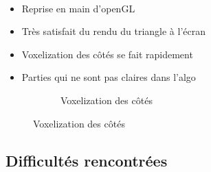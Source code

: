 \begin{frame}[fragile=singleslide]{\insertsectionhead}
  \framesubtitle{\insertsubsectionhead}
  \begin{itemize}
    \item Reprise en main d'openGL
  \end{itemize}
  \vspace{0.3cm}
  \begin{itemize}
    \item Très satisfait du rendu du triangle à l'écran
  \end{itemize}
  \vspace{0.3cm}
  \begin{itemize}
    \item Voxelization des côtés se fait rapidement
  \end{itemize}
  \vspace{0.3cm}
  \begin{itemize}
    \item Parties qui ne sont pas claires dans l'algo
  \end{itemize}
  \vspace{0.2cm}
  \begin{figure}
        \begin{subfigure}{0.6\textwidth}
          \caption*{Voxelization des côtés}
        \end{subfigure}
      \end{figure}
\end{frame}

\subsection{Difficultés rencontrées}


